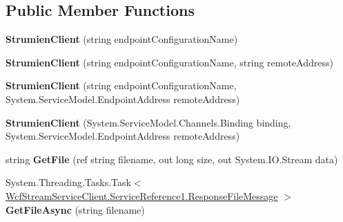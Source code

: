 \subsection*{Public Member Functions}
\begin{DoxyCompactItemize}
\item 
\mbox{\label{class_wcf_stream_service_client_1_1_service_reference1_1_1_strumien_client_afcfe8215f4224affad0aea5e7e390746}} 
{\bfseries Strumien\+Client} (string endpoint\+Configuration\+Name)
\item 
\mbox{\label{class_wcf_stream_service_client_1_1_service_reference1_1_1_strumien_client_abb5127a4e53a82f72639f9ae2341b0dc}} 
{\bfseries Strumien\+Client} (string endpoint\+Configuration\+Name, string remote\+Address)
\item 
\mbox{\label{class_wcf_stream_service_client_1_1_service_reference1_1_1_strumien_client_a4e00a4c13745ec85fa9e92322f4a1154}} 
{\bfseries Strumien\+Client} (string endpoint\+Configuration\+Name, System.\+Service\+Model.\+Endpoint\+Address remote\+Address)
\item 
\mbox{\label{class_wcf_stream_service_client_1_1_service_reference1_1_1_strumien_client_ae73fab9a69def518ad5a6ec7e84f46fc}} 
{\bfseries Strumien\+Client} (System.\+Service\+Model.\+Channels.\+Binding binding, System.\+Service\+Model.\+Endpoint\+Address remote\+Address)
\item 
\mbox{\label{class_wcf_stream_service_client_1_1_service_reference1_1_1_strumien_client_afbec8baaf28d76f30a3d892812c2f734}} 
string {\bfseries Get\+File} (ref string filename, out long size, out System.\+I\+O.\+Stream data)
\item 
\mbox{\label{class_wcf_stream_service_client_1_1_service_reference1_1_1_strumien_client_acefdea1b17e0e4c1e4db7d8b915a53e3}} 
System.\+Threading.\+Tasks.\+Task$<$ \hyperlink{class_wcf_stream_service_client_1_1_service_reference1_1_1_response_file_message}{Wcf\+Stream\+Service\+Client.\+Service\+Reference1.\+Response\+File\+Message} $>$ {\bfseries Get\+File\+Async} (string filename)

\end{DoxyCompactItemize}
